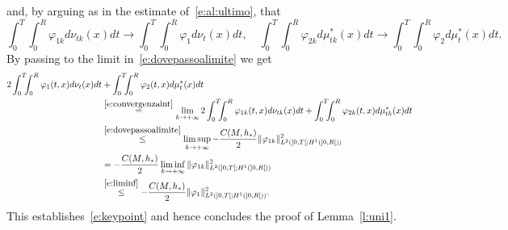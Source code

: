 \documentclass[11pt,leqno]{amsart}
\numberwithin{equation}{section}
\begin{document}
and, by arguing as in the estimate of~\eqref{e:al:ultimo}, that
\begin{equation}
\label{e:convergenzaint}
 \int_0^T  \! \! \! \int_0^R {\varphi}_{1k} d\nu_{tk}(x)dt \to
 \int_0^T  \! \! \! \int_0^R {\varphi}_{1}d\nu_{t}(x)dt, \quad 
 \int_0^T \! \! \! \int_0^R 
   {\varphi}_{2k}  d \mu^\ast_{tk} (x) dt
    \to
 \int_0^T \! \! \! \int_0^R 
   {\varphi}_{2} d \mu^\ast_{t} (x) dt.
 \end{equation}
By passing to the limit in~\eqref{e:dovepassoalimite} we get
\begin{equation}
\begin{split}
  2 \int_0^T  \! \! \! \int_0^R {\varphi}_{1}(t,x) d\nu_{t}(x)dt
&  +
   \int_0^T \! \! \! \int_0^R 
   {\varphi}_{2} (t, x) d \mu^\ast_{t} (x) dt \\
   & \stackrel{\eqref{e:convergenzaint}}{=}
    \lim_{k \to + \infty}
     2 \int_0^T  \! \! \! \int_0^R {\varphi}_{1k}(t,x) d\nu_{tk}(x)dt
  +
   \int_0^T \! \! \! \int_0^R 
   {\varphi}_{2k} (t, x) d \mu^\ast_{tk} (x) dt \\
   & \stackrel{\eqref{e:dovepassoalimite}}{\leq}
   \limsup_{k \to + \infty}
   -\frac{C(M, h_\ast)}{2}
    \| {\varphi}_{1k} \|^2_{L^2 (]0, T[; H^1 (]0, R[)) } \\
    & = - \frac{C(M, h_\ast)}{2} \liminf_{k \to + \infty}
    \| {\varphi}_{1k} \|^2_{L^2 (]0, T[; H^1 (]0, R[)) } \\
    & \stackrel{\eqref{e:liminf}}{\leq}
    - \frac{C(M, h_\ast)}{2} 
    \| {\varphi}_1 \|^2_{L^2 (]0, T[; H^1 (]0, R[)) }.
\end{split}
\end{equation}
This establishes~\eqref{e:keypoint} and hence concludes the proof of Lemma~\ref{l:uni1}. 
\end{document}
